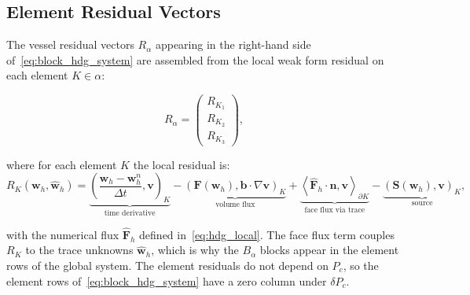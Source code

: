 \documentclass[11pt]{article}
\begin{document}
\subsection{Element Residual Vectors}

The vessel residual vectors $R_\alpha$ appearing in the right-hand
side of~\eqref{eq:block_hdg_system} are assembled from the local
weak form residual on each element $K \in \alpha$:

\begin{equation}
R_\alpha
=
\begin{pmatrix}
R_{K_1} \\ R_{K_2} \\ R_{K_3}
\end{pmatrix},
\end{equation}

where for each element $K$ the local residual is:
\begin{equation}
R_K(\mathbf{w}_h, \widehat{\mathbf{w}}_h)
=
\underbrace{
\left(\frac{\mathbf{w}_h - \mathbf{w}_h^n}{\Delta t},
\mathbf{v}\right)_K
}_{\text{time derivative}}
-
\underbrace{
\left(\mathbf{F}(\mathbf{w}_h),
\bm{b}\cdot\nabla\mathbf{v}\right)_K
}_{\text{volume flux}}
+
\underbrace{
\left\langle
\widehat{\mathbf{F}}_h \cdot \bm{n},
\mathbf{v}
\right\rangle_{\partial K}
}_{\text{face flux via trace}}
-
\underbrace{
\left(\mathbf{S}(\mathbf{w}_h),
\mathbf{v}\right)_K
}_{\text{source}},
\label{eq:RK}
\end{equation}

with the numerical flux $\widehat{\mathbf{F}}_h$ defined
in~\eqref{eq:hdg_local}. The face flux term couples $R_K$
to the trace unknowns $\widehat{\mathbf{w}}_h$, which is
why the $B_\alpha$ blocks appear in the element rows of
the global system. The element residuals do not depend on
$P_c$, so the element rows of~\eqref{eq:block_hdg_system} have
a zero column under $\delta P_c$.
\end{document}
